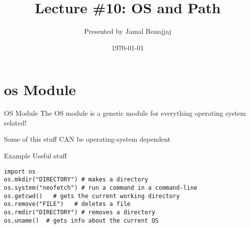 %
%



\title{Lecture \#10: OS and Path}
\date{\today}
\author{Presented by Jamal Bouajjaj}

\makeatletter
{}%
\makeatother



\maketitle

\section{os Module}

\begin{frame}{OS Module}
  The OS module is a generic module for everything operating system related!

  Some of this stuff CAN be operating-system dependent
\end{frame}

\begin{frame}[containsverbatim]{Example Useful stuff}
\begin{verbatim}
import os
os.mkdir("DIRECTORY") # makes a directory
os.system("neofetch") # run a command in a command-line
os.getcwd()   # gets the current working directory
os.remove("FILE")   # deletes a file
os.rmdir("DIRECTORY") # removes a directory
os.uname()  # gets info about the current OS
\end{verbatim}
\end{frame}


